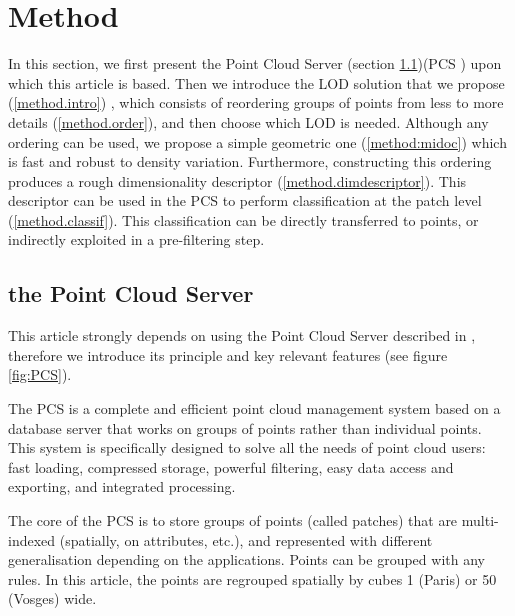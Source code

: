 

\section{Method}
	\label{sec:method}
	
	In this section, we first present the Point Cloud Server (section \ref{method.PCS})(PCS \cite{cura2015})
	upon which this article is based. Then we introduce the LOD solution that we propose (\ref{method.intro})
	, which consists of reordering groups of points from less to more details (\ref{method.order}), and then choose which LOD is needed.
	Although any ordering can be used, we propose a simple geometric one (\ref{method:midoc}) which is fast and robust to density variation. 
	Furthermore, constructing this ordering produces a rough dimensionality descriptor (\ref{method.dimdescriptor}). 
	This descriptor can be used in the PCS to perform classification at the patch level (\ref{method.classif}). This classification can be directly transferred to points, or indirectly exploited in a pre-filtering step.
	
	\subsection{the Point Cloud Server}
	\label{method.PCS}
		
		This article strongly depends on using the Point Cloud Server described in \cite{cura2015},
		therefore we introduce its principle and key relevant features (see figure \ref{fig:PCS}).
		
		The PCS is a complete and efficient point cloud management system based on a database server that works on groups of points rather than individual points.
		This system is specifically designed to solve all the needs of point cloud users:
		fast loading, compressed storage, powerful filtering, easy data access and exporting, and integrated processing.
		
		The core of the PCS is to store groups of points (called patches) that are multi-indexed (spatially, on attributes, etc.), and represented with different generalisation depending on the applications.
		Points can be grouped with any rules.
		In this article, the points are regrouped spatially by cubes 1 \metre (Paris) or 50 \metre (Vosges) wide.
		
